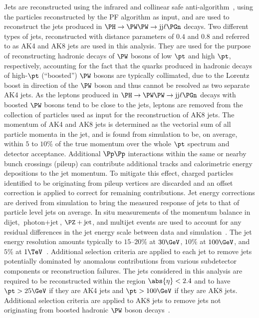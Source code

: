Jets are reconstructed using the infrared and collinear safe anti-\kt algorithm~\cite{Cacciari:2008gp, Cacciari:2011ma},
using the particles reconstructed by the PF algorithm as input,
and are used to reconstruct the jets produced in $\PHiggs \to \PW\PW \to \jet\jet\Plepton\Pnu$ decays.
Two different types of jets, reconstructed with distance parameters of $0.4$ and $0.8$ and referred to as AK4 and AK8 jets are used in this analysis.
They are used for the purpose of reconstructing hadronic decays of $\PW$ bosons of low $\pt$ and high $\pt$, respectively,
accounting for the fact that the quarks produced in hadronic decays of high-$\pt$ (``boosted'') $\PW$ bosons are typically collimated,
due to the Lorentz boost in direction of the $\PW$ boson and thus cannot be resolved as two separate AK4 jets.
As the leptons produced in $\PHiggs \to \PW\PW \to \jet\jet\Plepton\Pnu$ decays with boosted $\PW$ bosons tend to be close to the jets,
leptons are removed from the collection of particles used as input for the reconstruction of AK8 jets.
The momentum of AK4 and AK8 jets is determined as the vectorial sum of all particle momenta in the jet, 
and is found from simulation to be, on average, within $5$ to $10\%$ of the true momentum over the whole $\pt$ spectrum and detector acceptance.
Additional $\Pp\Pp$ interactions within the same or nearby bunch crossings (pileup) can contribute additional tracks and calorimetric energy depositions to the jet momentum. 
To mitigate this effect, charged particles identified to be originating from pileup vertices are discarded and an offset correction is applied to correct for remaining contributions. 
Jet energy corrections are derived from simulation to bring the measured response of jets to that of particle level jets on average. 
In situ measurements of the momentum balance in dijet, $\text{photon} + \text{jet}$, $\PZ + \text{jet}$, and multijet events 
are used to account for any residual differences in the jet energy scale between data and simulation~\cite{Khachatryan:2016kdb}. 
The jet energy resolution amounts typically to $15$--$20\%$ at $30\GeV$, $10\%$ at $100\GeV$, and $5\%$ at $1\TeV$~\cite{Khachatryan:2016kdb}. 
Additional selection criteria are applied to each jet to remove jets potentially dominated by anomalous contributions from various subdetector components or reconstruction failures.
The jets considered in this analysis are required to be reconstructed within the region $\abs{\eta} < 2.4$
and to have $\pt > 25\GeV$ if they are AK4 jets and $\pt > 100\GeV$ if they are AK8 jets.
Additional selection criteria are applied to AK8 jets to remove jets not originating from boosted hadronic $\PW$ boson decays~\cite{Sirunyan:2019quj}.

